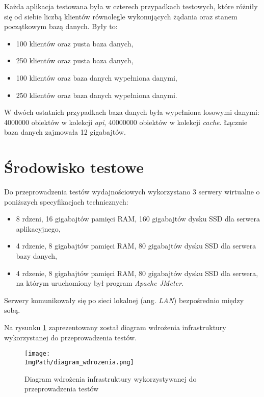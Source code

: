 Każda aplikacja testowana była w czterech przypadkach testowych, które różniły się od siebie liczbą klientów równolegle wykonujących żądania oraz stanem początkowym bazą danych. Były to:
\begin{itemize}
    \item 100 klientów oraz pusta baza danych,
    \item 250 klientów oraz pusta baza danych,
    \item 100 klientów oraz baza danych wypełniona danymi,
    \item 250 klientów oraz baza danych wypełniona danymi.
\end{itemize}
W dwóch ostatnich przypadkach baza danych była wypełniona losowymi danymi: 4000000 obiektów w kolekcji \textsl{api}, 40000000 obiektów w kolekcji \textsl{cache}. Łącznie baza danych zajmowała 12 gigabajtów.

\section{Środowisko testowe}
Do przeprowadzenia testów wydajnościowych wykorzystano 3 serwery wirtualne o poniższych specyfikacjach technicznych: 
\begin{itemize}
    \item 8 rdzeni, 16 gigabajtów pamięci RAM, 160 gigabajtów dysku SSD dla serwera aplikacyjnego,
    \item 4 rdzenie, 8 gigabajtów pamięci RAM, 80 gigabajtów dysku SSD dla serwera bazy danych, 
    \item 4 rdzenie, 8 gigabajtów pamięci RAM, 80 gigabajtów dysku SSD dla serwera, na którym uruchomiony był program \textsl{Apache JMeter}.
\end{itemize}
Serwery komunikowały się po sieci lokalnej (ang. \textsl{LAN}) bezpośrednio między sobą.

Na rysunku \ref{fig:deployment_diagram} zaprezentowany został diagram wdrożenia infrastruktury wykorzystanej do przeprowadzenia testów.
\begin{figure}[!ht]
\centering
\texttt{[image: \\ImgPath/diagram\_wdrozenia.png]}
\caption{Diagram wdrożenia infrastruktury wykorzystywanej do przeprowadzenia testów}
\label{fig:deployment_diagram}
\end{figure}

